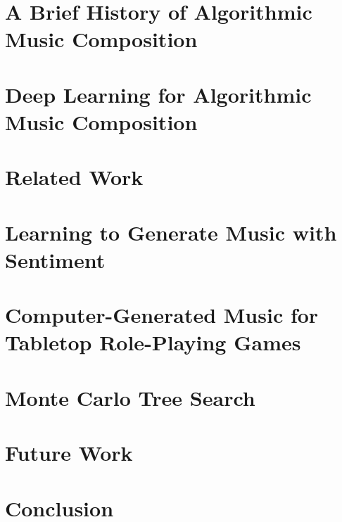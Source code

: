 \documentclass[11pt]{ucscthesis}
\begin{document}
\chapter{A Brief History of Algorithmic Music Composition}
\label{ch:amc}


\chapter{Deep Learning for Algorithmic Music Composition}
\label{ch:ml}


\chapter{Related Work}
\label{ch:related}


% 

\chapter{Learning to Generate Music with Sentiment}
\label{ch:ismir19}


\chapter{Computer-Generated Music for Tabletop Role-Playing Games}
\label{ch:aiide20}


\chapter{Monte Carlo Tree Search}
\label{ch:ismir21}


% 

\chapter{Future Work}
\label{ch:future}


\chapter{Conclusion}
\label{ch:conclusion}

\end{document}
